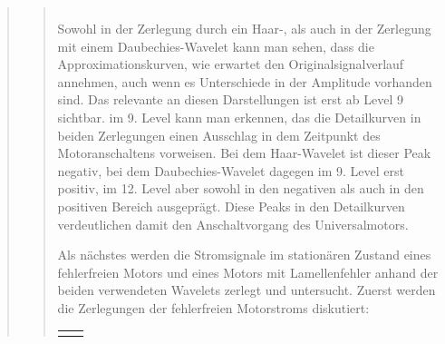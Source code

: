 \begin{quote}
\begin{quote}
\begin{center}
\begin{tabular}{ll}
                \end{tabular}
                \end{center}
                
                \vspace{2em}
                
                Sowohl in der Zerlegung durch ein Haar-, als auch in der
                Zerlegung mit einem Daubechies-Wavelet kann man sehen, dass die
                Approximationskurven, wie erwartet den Originalsignalverlauf
                annehmen, auch wenn es Unterschiede in der Amplitude vorhanden
                sind. Das relevante an diesen Darstellungen ist erst ab Level 9
                sichtbar. im 9. Level kann man erkennen, das die Detailkurven in
                beiden Zerlegungen einen Ausschlag in dem Zeitpunkt des
                Motoranschaltens vorweisen. Bei dem Haar-Wavelet ist dieser Peak
                negativ, bei dem Daubechies-Wavelet dagegen im 9. Level erst
                positiv, im 12. Level aber sowohl in den negativen als auch in
                den positiven Bereich ausgeprägt. Diese Peaks in den
                Detailkurven verdeutlichen damit den Anschaltvorgang des
                Universalmotors.
                
                
                
                
                Als nächstes werden die Stromsignale im stationären Zustand
                eines fehlerfreien Motors und eines Motors mit Lamellenfehler
                anhand der beiden verwendeten Wavelets zerlegt und untersucht.
                Zuerst werden die Zerlegungen der fehlerfreien Motorstroms
                diskutiert:
                
                 \begin{center}
                \begin{tabular}{ll}
    
                \hspace{-8em}
                    \begin{minipage}{0.6\textwidth}
    

\end{minipage}
\end{tabular}
\end{center}
\end{quote}
\end{quote}
